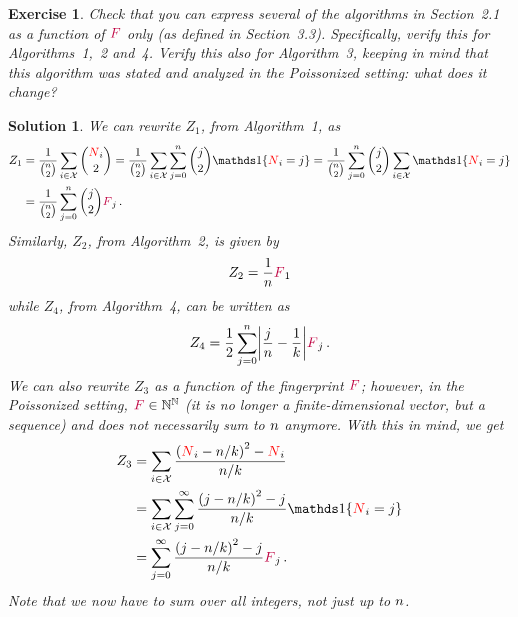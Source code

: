 \documentclass[biber]{nowfnt} %
\newtheorem{question}{Exercise}[chapter]
\newtheorem{solution}{Solution}[chapter]
\newcommand{\occur}{\textcolor{red}{N}}
\newcommand{\freq}{\textcolor{purple}{F}}
\newcommand{\occur}{N}
\newcommand{\freq}{F}
\begin{document}
\begin{question}\label{exo:reexpress:algos:frequency:only}
Check that you can express several of the algorithms in Section~2.1 as a function of $\freq$ only (as defined in Section~3.3). Specifically, verify this for Algorithms~1,~2 and~4. Verify this also for Algorithm~3, keeping in mind that this algorithm was stated and analyzed in the Poissonized setting: what does it change?
\end{question}
\begin{solution}
We can rewrite $Z_1$, from Algorithm~1, as
\begin{align*}
	Z_1  &= \frac{1}{\binom{\ns}{2}} \sum_{i\in\domain} \binom{\occur_i}{2} 
		= \frac{1}{\binom{\ns}{2}} \sum_{i\in\domain} \sum_{j=0}^{\ns} \binom{j}{2} \indic{\occur_i=j}
		= \frac{1}{\binom{\ns}{2}} \sum_{j=0}^{\ns} \binom{j}{2} \sum_{i\in\domain}\indic{\occur_i=j} \\
		&= \frac{1}{\binom{\ns}{2}} \sum_{j=0}^{\ns} \binom{j}{2} \freq_j\,.
\end{align*}
Similarly, $Z_2$, from Algorithm~2, is given by
\[
	Z_2 = \frac{1}{\ns} \freq_1
\]
while $Z_4$, from Algorithm~4, can be written as
\[
	Z_4 = \frac{1}{2}\sum_{j=0}^{\ns} \abs{\frac{j}{\ns}-\frac{1}{\ab}} \freq_j\,.
\]
We can also rewrite $Z_3$ as a function of the fingerprint $\freq$; however, in the Poissonized setting, $\freq\in \N^{\N}$ (it is no longer a finite-dimensional vector, but a sequence) and does not necessarily sum to $n$ anymore. With this in mind, we get
\begin{align*}
	Z_3 
	&= \sum_{i\in\domain} \frac{\Paren{\occur_i-\ns/\ab}^2-\occur_i}{\ns/\ab} \\
	&= \sum_{i\in\domain} \sum_{j=0}^{\infty} \frac{\Paren{j-\ns/\ab}^2-j}{\ns/\ab} \indic{\occur_i=j} \\
	&= \sum_{j=0}^{\infty} \frac{\Paren{j-\ns/\ab}^2-j}{\ns/\ab} \freq_j\,.
\end{align*}
Note that we now have to sum over all integers, not just up to $n$.
\end{solution}
\end{document}
